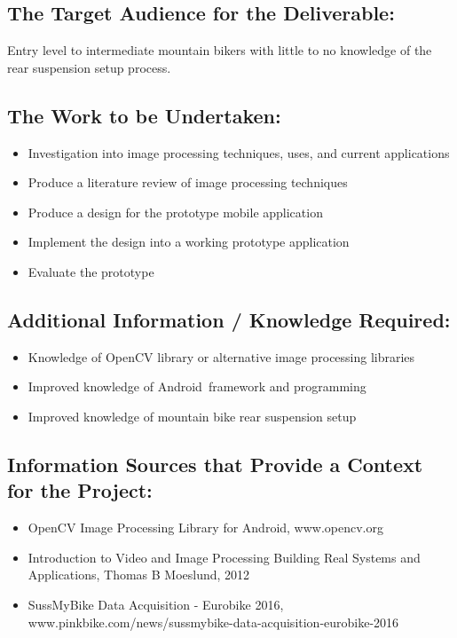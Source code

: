 \documentclass[a4paper, 12pt]{article}
\begin{document}
	\subsection[Audience]{The Target Audience for the Deliverable:}
	Entry level to intermediate mountain bikers with little to no knowledge of the rear suspension setup process.
	
	\subsection[Work]{The Work to be Undertaken:}
	\begin{itemize}
		\item Investigation into image processing techniques, uses, and current applications
		\item Produce a literature review of image processing techniques
		\item Produce a design for the prototype mobile application
		\item Implement the design into a working prototype application
		\item Evaluate the prototype
	\end{itemize}
	
	\subsection[Additional Info]{Additional Information / Knowledge Required:}
	\begin{itemize}
		\item Knowledge of OpenCV library or alternative image processing libraries
		\item Improved knowledge of Android\texttrademark\ framework and programming
		\item Improved knowledge of mountain bike rear suspension setup
	\end{itemize}
	
	\subsection[Sources]{Information Sources that Provide a Context for the Project:}
	\begin{itemize}
		\item OpenCV Image Processing Library for Android\texttrademark, www.opencv.org 
		\item Introduction to Video and Image Processing Building Real Systems and Applications, Thomas B Moeslund, 2012
		\item SussMyBike Data Acquisition - Eurobike 2016,\newline
		www.pinkbike.com/news/sussmybike-data-acquisition-eurobike-2016
	\end{itemize}
	
\end{document}
